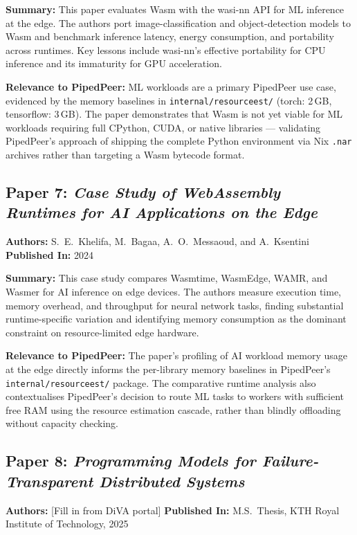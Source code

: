 \noindent\textbf{Summary:}
This paper evaluates Wasm with the wasi-nn API for ML inference at the edge. The
authors port image-classification and object-detection models to Wasm and benchmark
inference latency, energy consumption, and portability across runtimes. Key lessons
include wasi-nn's effective portability for CPU inference and its immaturity for GPU
acceleration.

\noindent\textbf{Relevance to PipedPeer:}
ML workloads are a primary PipedPeer use case, evidenced by the memory baselines in
\texttt{internal/resourceest/} (torch: 2\,GB, tensorflow: 3\,GB). The paper
demonstrates that Wasm is not yet viable for ML workloads requiring full CPython,
CUDA, or native libraries — validating PipedPeer's approach of shipping the complete
Python environment via Nix \texttt{.nar} archives rather than targeting a Wasm
bytecode format.

\subsection*{Paper 7: \textit{Case Study of WebAssembly Runtimes for AI Applications
on the Edge}}
\textbf{Authors:} S.~E.~Khelifa, M.~Bagaa, A.~O.~Messaoud, and A.~Ksentini \quad
\textbf{Published In:} 2024~\cite{khelifa2024}

\noindent\textbf{Summary:}
This case study compares Wasmtime, WasmEdge, WAMR, and Wasmer for AI inference
on edge devices. The authors measure execution time, memory overhead, and throughput
for neural network tasks, finding substantial runtime-specific variation and
identifying memory consumption as the dominant constraint on resource-limited edge
hardware.

\noindent\textbf{Relevance to PipedPeer:}
The paper's profiling of AI workload memory usage at the edge directly informs the
per-library memory baselines in PipedPeer's \texttt{internal/resourceest/} package.
The comparative runtime analysis also contextualises PipedPeer's decision to route
ML tasks to workers with sufficient free RAM using the resource estimation cascade,
rather than blindly offloading without capacity checking.

\subsection*{Paper 8: \textit{Programming Models for Failure-Transparent Distributed
Systems}}
\textbf{Authors:} [Fill in from DiVA portal] \quad
\textbf{Published In:} M.S.\ Thesis, KTH Royal Institute of Technology, 2025~\cite{author2025thesis}

